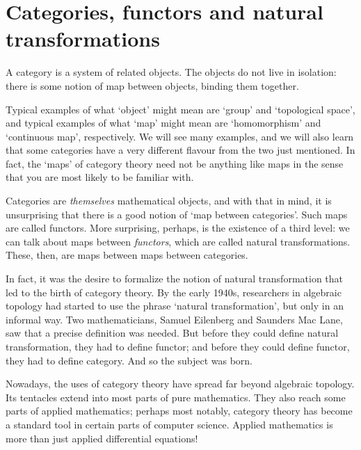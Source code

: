 % 
% 
% 

\chapter{Categories, functors and natural transformations}
\label{ch:cfnt}

A category is a system of related objects.  The objects do not live in
isolation: there is some notion of map between objects, binding them
together.

Typical examples of what `object' might mean are `group' and `topological
space', and typical examples of what `map' might mean are `homomorphism'
and `continuous map', respectively.  We will see many examples, and we will
also learn that some categories have a very different flavour from the two
just mentioned.  In fact, the `maps' of category theory need not be
anything like maps in the sense that you are most likely to be familiar
with.

Categories are \emph{themselves} mathematical objects, and with that in
mind, it is unsurprising that there is a good notion of `map between
categories'.  Such maps are called functors.  More surprising, perhaps, is
the existence of a third level: we can talk about maps between
\emph{functors}, which are called natural transformations.  These, then,
are maps between maps between categories.

In fact, it was the desire to formalize the notion of natural
transformation that led to the birth of category theory.  By the early
1940s, researchers in algebraic topology had started to use the phrase
`natural transformation', but only in an informal way.  Two mathematicians,
Samuel Eilenberg%
%
%
and Saunders Mac Lane,%
%
%
saw that a precise definition was needed.  But before they could define
natural transformation, they had to define functor; and before they could
define functor, they had to define category.  And so the subject was born.

Nowadays, the uses of category theory have spread far beyond algebraic
topology.  Its tentacles extend into most parts of pure mathematics.  They
also reach some parts of applied mathematics; perhaps most notably,
category theory has become a standard tool in certain parts of computer%
%
%
science.  Applied%
%
% 
mathematics is more than just applied differential equations!




